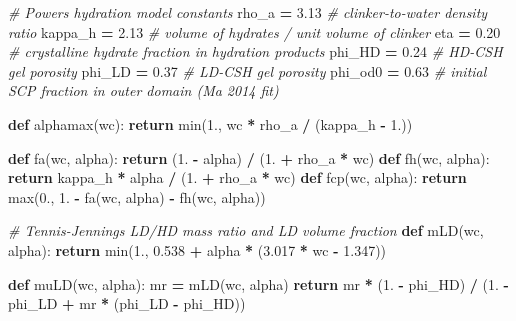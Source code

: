 \documentclass[
  a4paper,
  numbers=noendperiod,
  DIV=12]{scrreprt}
\newenvironment{Shaded}{\begin{snugshade}}{\end{snugshade}}
\newcommand{\BuiltInTok}[1]{#1}
\newcommand{\CommentTok}[1]{\textcolor[rgb]{0.56,0.35,0.01}{\textit{#1}}}
\newcommand{\ControlFlowTok}[1]{\textcolor[rgb]{0.13,0.29,0.53}{\textbf{#1}}}
\newcommand{\FloatTok}[1]{\textcolor[rgb]{0.00,0.00,0.81}{#1}}
\newcommand{\KeywordTok}[1]{\textcolor[rgb]{0.13,0.29,0.53}{\textbf{#1}}}
\newcommand{\NormalTok}[1]{#1}
\newcommand{\OperatorTok}[1]{\textcolor[rgb]{0.81,0.36,0.00}{\textbf{#1}}}
\begin{document}
\begin{Shaded}
\begin{Highlighting}[]
\CommentTok{\# Powers\textquotesingle{} hydration model constants}
\NormalTok{rho\_a   }\OperatorTok{=} \FloatTok{3.13}   \CommentTok{\# clinker{-}to{-}water density ratio}
\NormalTok{kappa\_h }\OperatorTok{=} \FloatTok{2.13}   \CommentTok{\# volume of hydrates / unit volume of clinker}
\NormalTok{eta     }\OperatorTok{=} \FloatTok{0.20}   \CommentTok{\# crystalline hydrate fraction in hydration products}
\NormalTok{phi\_HD  }\OperatorTok{=} \FloatTok{0.24}   \CommentTok{\# HD{-}CSH gel porosity}
\NormalTok{phi\_LD  }\OperatorTok{=} \FloatTok{0.37}   \CommentTok{\# LD{-}CSH gel porosity}
\NormalTok{phi\_od0 }\OperatorTok{=} \FloatTok{0.63}   \CommentTok{\# initial SCP fraction in outer domain (Ma 2014 fit)}

\KeywordTok{def}\NormalTok{ alphamax(wc):}
    \ControlFlowTok{return} \BuiltInTok{min}\NormalTok{(}\FloatTok{1.}\NormalTok{, wc }\OperatorTok{*}\NormalTok{ rho\_a }\OperatorTok{/}\NormalTok{ (kappa\_h }\OperatorTok{{-}} \FloatTok{1.}\NormalTok{))}

\KeywordTok{def}\NormalTok{ fa(wc, alpha):   }\ControlFlowTok{return}\NormalTok{ (}\FloatTok{1.} \OperatorTok{{-}}\NormalTok{ alpha) }\OperatorTok{/}\NormalTok{ (}\FloatTok{1.} \OperatorTok{+}\NormalTok{ rho\_a }\OperatorTok{*}\NormalTok{ wc)}
\KeywordTok{def}\NormalTok{ fh(wc, alpha):   }\ControlFlowTok{return}\NormalTok{ kappa\_h }\OperatorTok{*}\NormalTok{ alpha }\OperatorTok{/}\NormalTok{ (}\FloatTok{1.} \OperatorTok{+}\NormalTok{ rho\_a }\OperatorTok{*}\NormalTok{ wc)}
\KeywordTok{def}\NormalTok{ fcp(wc, alpha):  }\ControlFlowTok{return} \BuiltInTok{max}\NormalTok{(}\FloatTok{0.}\NormalTok{, }\FloatTok{1.} \OperatorTok{{-}}\NormalTok{ fa(wc, alpha) }\OperatorTok{{-}}\NormalTok{ fh(wc, alpha))}

\CommentTok{\# Tennis{-}Jennings LD/HD mass ratio and LD volume fraction}
\KeywordTok{def}\NormalTok{ mLD(wc, alpha):}
    \ControlFlowTok{return} \BuiltInTok{min}\NormalTok{(}\FloatTok{1.}\NormalTok{, }\FloatTok{0.538} \OperatorTok{+}\NormalTok{ alpha }\OperatorTok{*}\NormalTok{ (}\FloatTok{3.017} \OperatorTok{*}\NormalTok{ wc }\OperatorTok{{-}} \FloatTok{1.347}\NormalTok{))}

\KeywordTok{def}\NormalTok{ muLD(wc, alpha):}
\NormalTok{    mr }\OperatorTok{=}\NormalTok{ mLD(wc, alpha)}
    \ControlFlowTok{return}\NormalTok{ mr }\OperatorTok{*}\NormalTok{ (}\FloatTok{1.} \OperatorTok{{-}}\NormalTok{ phi\_HD) }\OperatorTok{/}\NormalTok{ (}\FloatTok{1.} \OperatorTok{{-}}\NormalTok{ phi\_LD }\OperatorTok{+}\NormalTok{ mr }\OperatorTok{*}\NormalTok{ (phi\_LD }\OperatorTok{{-}}\NormalTok{ phi\_HD))}


\end{Highlighting}
\end{Shaded}
\end{document}
